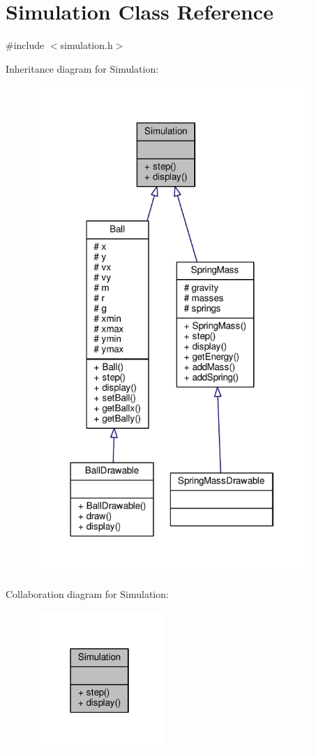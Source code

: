 \hypertarget{classSimulation}{}\section{Simulation Class Reference}
\label{classSimulation}


{\ttfamily \#include $<$simulation.\+h$>$}



Inheritance diagram for Simulation\+:
\nopagebreak
\begin{figure}[H]
\begin{center}
\leavevmode
\includegraphics[width=298pt]{classSimulation__inherit__graph}
\end{center}
\end{figure}


Collaboration diagram for Simulation\+:
\nopagebreak
\begin{figure}[H]
\begin{center}
\leavevmode
\includegraphics[width=142pt]{classSimulation__coll__graph}
\end{center}
\end{figure}

